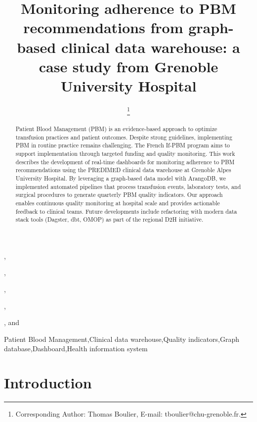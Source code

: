 \documentclass{IOS-Book-Article}
\def\hb{\hbox to 11.5 cm{}}
\begin{document}
\pagestyle{headings}
\def\thepage{}
\begin{frontmatter}

\title{Monitoring adherence to PBM recommendations from graph-based clinical data warehouse: a case study from Grenoble University Hospital}

\markboth{}{October 2025\hb}

\author[A]{ },
\author[A]{ },
\author[A]{ },
\author[A]{ },
\author[A]{ %
\thanks{Corresponding Author: Thomas Boulier, E-mail: tboulier@chu-grenoble.fr.}}, 
and
\author[A]{ }

\address[A]{Univ. Grenoble Alpes, CNRS, UMR 5525, VetAgro Sup, Grenoble INP, CHU Grenoble Alpes, TIMC, 38000 Grenoble, France}

\begin{abstract}
Patient Blood Management (PBM) is an evidence-based approach to optimize transfusion practices and patient outcomes. Despite strong guidelines, implementing PBM in routine practice remains challenging. The French If-PBM program aims to support implementation through targeted funding and quality monitoring. This work describes the development of real-time dashboards for monitoring adherence to PBM recommendations using the PREDIMED clinical data warehouse at Grenoble Alpes University Hospital. By leveraging a graph-based data model with ArangoDB, we implemented automated pipelines that process transfusion events, laboratory tests, and surgical procedures to generate quarterly PBM quality indicators. Our approach enables continuous quality monitoring at hospital scale and provides actionable feedback to clinical teams. Future developments include refactoring with modern data stack tools (Dagster, dbt, OMOP) as part of the regional D2H initiative.
\end{abstract}

\begin{keyword}
Patient Blood Management\sep Clinical data warehouse\sep Quality indicators\sep Graph database\sep Dashboard\sep Health information system
\end{keyword}
\end{frontmatter}

\markboth{October 2025\hb}{October 2025\hb}

\section{Introduction}
\end{document}
